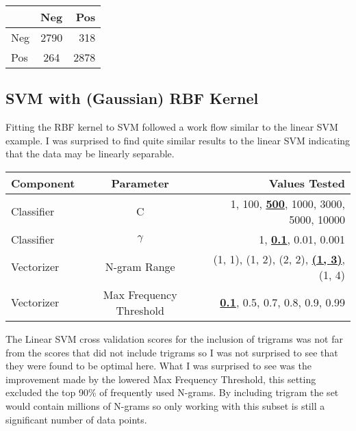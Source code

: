 \documentclass[11pt]{article}
\begin{document}
\begin{center}
	 \label{cm_lin}
	\begin{tabular}{ l | c | r } \hline
		& 	Neg  	& Pos\\ \hline
	Neg &	2790	& 318 \\
	Pos &	264		& 2878
	\end{tabular}
\end{center}

\subsection{SVM with (Gaussian) RBF Kernel}
Fitting the RBF kernel to SVM followed a work flow similar to the linear SVM example. I was surprised to find quite similar results to the linear SVM indicating that the data may be linearly separable.

\begin{center}
	 \label{params_svm}
	\begin{tabular}{ l | c | r } \hline
	Component & Parameter  & Values Tested\\ \hline
	Classifier &	C 				& 1, 100, \textbf{\underline{500}}, 1000, 3000, 5000, 10000\\
	Classifier &	$\gamma$			& 1, \textbf{\underline{0.1}}, 0.01, 0.001\\
	Vectorizer &	N-gram Range 	& (1, 1), (1, 2), (2, 2), \textbf{\underline{(1, 3)}}, (1, 4)\\
	Vectorizer & 	Max Frequency Threshold	& 	\textbf{\underline{0.1}}, 0.5, 0.7, 0.8, 0.9, 0.99\\
	\end{tabular}
\end{center}
       
The Linear SVM cross validation scores for the inclusion of trigrams was not far from the scores that did not include trigrams so I was not surprised to see that they were found to be optimal here. What I was surprised to see was the improvement made by the lowered Max Frequency Threshold, this setting excluded the top 90\% of frequently used N-grams. By including trigram the set would contain millions of N-grams so only working with this subset is still a significant number of data points.\\
\end{document}
